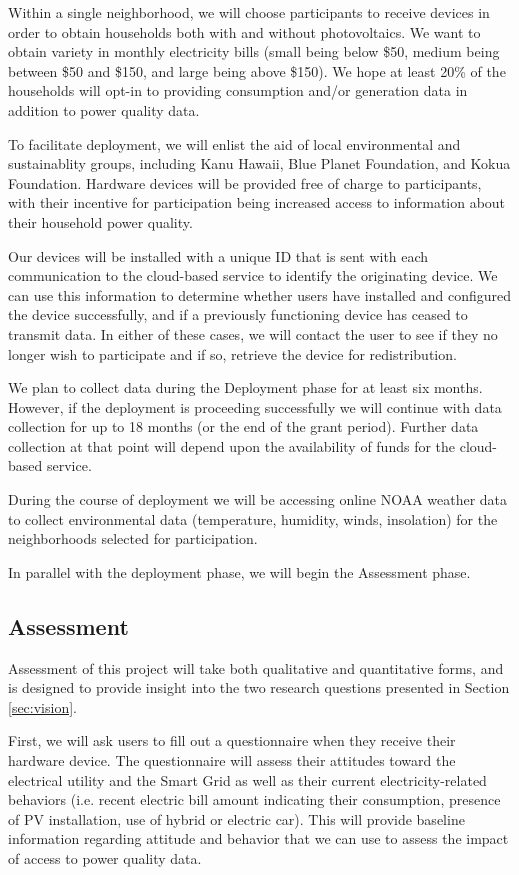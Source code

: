 Within a single neighborhood, we will choose participants to receive devices in order to obtain households both with and without photovoltaics. We want to obtain variety in monthly electricity bills (small being below \$50, medium being between \$50 and \$150, and large being above \$150).  We hope at least 20\% of the households will opt-in to providing consumption and/or generation data in addition to power quality data. 

To facilitate deployment, we will enlist the aid of local environmental and sustainablity groups, including Kanu Hawaii, Blue Planet Foundation, and Kokua Foundation.  Hardware devices will be provided free of charge to participants, with their incentive for participation being increased access to information about their household power quality.  

Our devices will be installed with a unique ID that is sent with each communication to the cloud-based service to identify the originating device.  We can use this information to determine whether users have installed and configured the device successfully, and if a previously functioning device has ceased to transmit data.   In either of these cases, we will contact the user to see if they no longer wish to participate and if so, retrieve the device for redistribution. 

We plan to collect data during the Deployment phase for at least six months. However, if the deployment is proceeding successfully we will continue with data collection for up to 18 months (or the end of the grant period).  Further data collection at that point will depend upon the availability of funds for the cloud-based service.

During the course of deployment we will be accessing online NOAA weather data to collect environmental data (temperature, humidity, winds, insolation) for the neighborhoods selected for participation. 

In parallel with the deployment phase, we will begin the Assessment phase. 

\subsection{Assessment}

Assessment of this project will take both qualitative and quantitative forms, and is designed to provide insight into the two research questions presented in Section \ref{sec:vision}.

First, we will ask users to fill out a questionnaire when they receive their hardware device.  The questionnaire will assess their attitudes toward the electrical utility and the Smart Grid as well as their current electricity-related behaviors (i.e. recent electric bill amount indicating their consumption, presence of PV installation, use of hybrid or electric car). This will provide baseline information regarding attitude and behavior that we can use to assess the impact of access to power quality data. 

